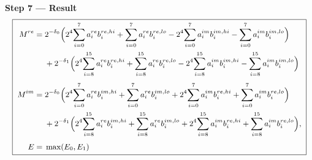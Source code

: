 \documentclass[fleqn]{article}
\begin{document}
\textbf{Step 7 --- Result}
{\setlength{\mathindent}{0em}
\[
\small
\boxed{\;
\begin{aligned}
M^{re} ={}& 2^{-\delta_0}\Big(2^{4}\!\sum_{i=0}^{7} a_i^{re} b_i^{re,hi} + \sum_{i=0}^{7} a_i^{re} b_i^{re,lo} - 2^{4}\!\sum_{i=0}^{7} a_i^{im} b_i^{im,hi} - \sum_{i=0}^{7} a_i^{im} b_i^{im,lo}\Big) \\
  & + 2^{-\delta_1}\Big(2^{4}\!\sum_{i=8}^{15} a_i^{re} b_i^{re,hi} + \sum_{i=8}^{15} a_i^{re} b_i^{re,lo} - 2^{4}\!\sum_{i=8}^{15} a_i^{im} b_i^{im,hi} - \sum_{i=8}^{15} a_i^{im} b_i^{im,lo}\Big) \\[0.3em]
M^{im} ={}& 2^{-\delta_0}\Big(2^{4}\!\sum_{i=0}^{7} a_i^{re} b_i^{im,hi} + \sum_{i=0}^{7} a_i^{re} b_i^{im,lo} + 2^{4}\!\sum_{i=0}^{7} a_i^{im} b_i^{re,hi} + \sum_{i=0}^{7} a_i^{im} b_i^{re,lo}\Big) \\
  & + 2^{-\delta_1}\Big(2^{4}\!\sum_{i=8}^{15} a_i^{re} b_i^{im,hi} + \sum_{i=8}^{15} a_i^{re} b_i^{im,lo} + 2^{4}\!\sum_{i=8}^{15} a_i^{im} b_i^{re,hi} + \sum_{i=8}^{15} a_i^{im} b_i^{re,lo}\Big), \\[0.3em]
E ={}& \max(E_0,E_1)
\end{aligned}
\;}
\]
}
\end{document}
